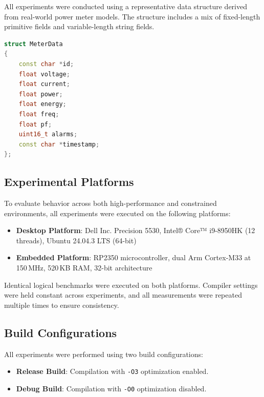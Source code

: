 \documentclass[11pt, a4paper]{article}
\begin{document}
All experiments were conducted using a representative data structure derived from real-world power meter models. The structure includes a mix of fixed-length primitive fields and variable-length string fields.

\begin{lstlisting}[language=C++, caption={Test data structure used for benchmarking}, breaklines=true]
struct MeterData
{
    const char *id;
    float voltage;
    float current;
    float power;
    float energy;
    float freq;
    float pf;
    uint16_t alarms;
    const char *timestamp;
};
\end{lstlisting}

\subsection{Experimental Platforms}

To evaluate behavior across both high-performance and constrained environments, all experiments were executed on the following platforms:

\begin{itemize}
    \item \textbf{Desktop Platform}:  
    Dell Inc. Precision 5530, Intel® Core™ i9-8950HK (12 threads), Ubuntu 24.04.3 LTS (64-bit)

    \item \textbf{Embedded Platform}:  
    RP2350 microcontroller, dual Arm Cortex-M33 at 150\,MHz, 520\,KB RAM, 32-bit architecture
\end{itemize}

Identical logical benchmarks were executed on both platforms. Compiler settings were held constant across experiments, and all measurements were repeated multiple times to ensure consistency.

\subsection{Build Configurations}

All experiments were performed using two build configurations:

\begin{itemize}
    \item \textbf{Release Build}: Compilation with \texttt{-O3} optimization enabled.
    \item \textbf{Debug Build}: Compilation with \texttt{-O0} optimization disabled.
\end{itemize}
\end{document}
